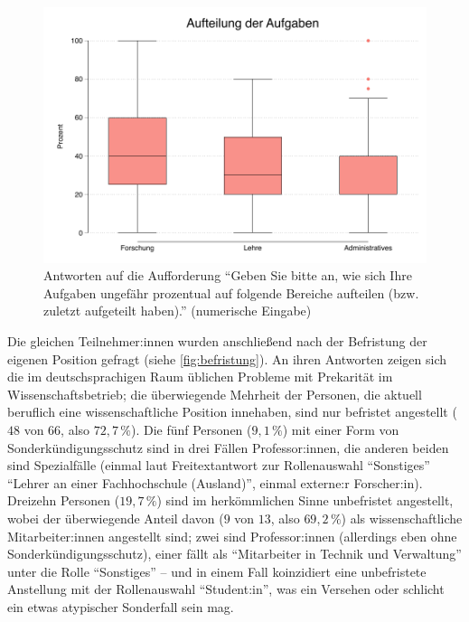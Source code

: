 \documentclass{scrartcl}
\begin{document}
\begin{figure}[t]
   \includegraphics[width=1\textwidth]{aufteilung.pdf}
   \caption{Antworten auf die Aufforderung \enquote{Geben Sie bitte an, wie sich Ihre Aufgaben ungefähr prozentual auf folgende Bereiche aufteilen (bzw. zuletzt aufgeteilt haben).} (numerische Eingabe)}
   \label{fig:aufteilung}
\end{figure}

Die gleichen Teilnehmer:innen wurden anschließend nach der Befristung der eigenen Position gefragt (siehe \autoref{fig:befristung}).
An ihren Antworten zeigen sich die im deutschsprachigen Raum üblichen Probleme mit Prekarität im Wissenschaftsbetrieb; die überwiegende Mehrheit der Personen, die aktuell beruflich eine wissenschaftliche Position innehaben, sind nur befristet angestellt ($48$ von $66$, also $72,7\,\%$).
Die fünf Personen ($9,1\,\%$) mit einer Form von Sonderkündigungsschutz sind in drei Fällen Professor:innen, die anderen beiden sind Spezialfälle (einmal laut Freitextantwort zur Rollenauswahl \enquote{Sonstiges} \enquote{Lehrer an einer Fachhochschule (Ausland)}, einmal externe:r Forscher:in).
Dreizehn Personen ($19,7\,\%$) sind im herkömmlichen Sinne unbefristet angestellt, wobei der überwiegende Anteil davon ($9$ von $13$, also $69,2\,\%$) als wissenschaftliche Mitarbeiter:innen angestellt sind; zwei sind Professor:innen (allerdings eben ohne Sonderkündigungsschutz), einer fällt als \enquote{Mitarbeiter in Technik und Verwaltung} unter die Rolle \enquote{Sonstiges} -- und in einem Fall koinzidiert eine unbefristete Anstellung mit der Rollenauswahl \enquote{Student:in}, was ein Versehen oder schlicht ein etwas atypischer Sonderfall sein mag.
\end{document}
